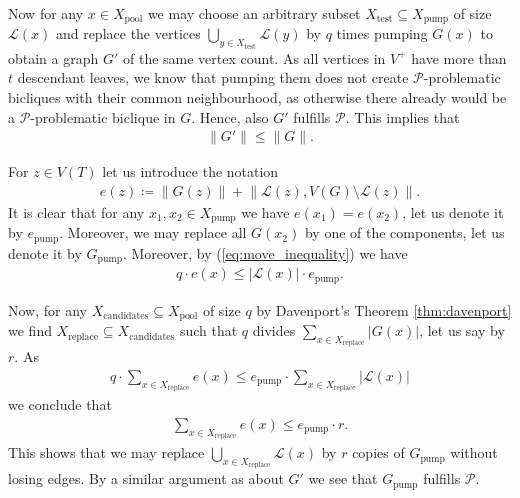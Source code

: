 \documentclass{article}
\theoremstyle{definition}
\theoremstyle{definition}
\theoremstyle{definition}
\theoremstyle{definition}
\theoremstyle{definition}
\theoremstyle{definition}
\theoremstyle{definition}
\theoremstyle{definition}
\theoremstyle{definition}
\theoremstyle{definition}
\begin{document}
    Now for any $x \in X_{\text{pool}}$ we may choose an arbitrary subset $X_{\text{test}} \subseteq X_{\text{pump}}$ of size $\mathscr{L}(x)$ and replace the vertices $\bigcup_{y \in X_{\text{test}}} \mathscr{L}(y)$ by $q$ times pumping $G(x)$ to obtain a graph $G'$ of the same vertex count.
    As all vertices in $V^+$ have more than $t$ descendant leaves, we know that pumping them does not create $\mathscr{P}$-problematic bicliques with their common neighbourhood, as otherwise there already would be a $\mathscr{P}$-problematic biclique in $G$. Hence, also $G'$ fulfills $\mathscr{P}$.
    This implies that
    \begin{align}
        \| G' \| \leq \| G \|. \label{eq:move_inequality}
    \end{align}

    For $z \in V(T)$ let us introduce the notation
    \begin{align}
        e(z) \coloneqq \left\| G(z) \right\| + \left\| \mathscr{L}(z), V(G) \setminus \mathscr{L}(z) \right\|.
    \end{align}
    It is clear that for any $x_1, x_2 \in X_{\text{pump}}$ we have $e(x_1) = e(x_2)$, let us denote it by $e_{\text{pump}}$.
    Moreover, we may replace all $G(x_2)$ by one of the components, let us denote it by $G_{\text{pump}}$.
    Moreover, by (\ref{eq:move_inequality}) we have
    \begin{align}
        q \cdot e(x) \leq |\mathscr{L}(x)| \cdot e_{\text{pump}}.
    \end{align}

    Now, for any $X_{\text{candidates}} \subseteq X_{\text{pool}}$ of size $q$ by Davenport's Theorem \ref{thm:davenport} we find $X_{\text{replace}} \subseteq X_{\text{candidates}}$ such that $q$ divides $\sum_{x \in X_{\text{replace}}} |G(x)|$, let us say by $r$.
    As
    \begin{align}
        q \cdot \sum_{x \in X_{\text{replace}}} e(x)
            \leq e_{\text{pump}} \cdot \sum_{x \in X_{\text{replace}}} |\mathscr{L}(x)|
    \end{align}
    we conclude that
    \begin{align}
        \sum_{x \in X_{\text{replace}}} e(x) \leq e_{\text{pump}} \cdot r.
    \end{align}
    This shows that we may replace $\bigcup_{x \in X_{\text{replace}}} \mathscr{L}(x)$ by $r$ copies of $G_{\text{pump}}$ without losing edges. By a similar argument as about $G'$ we see that $G_{\text{pump}}$ fulfills $\mathscr{P}$.
\end{document}
